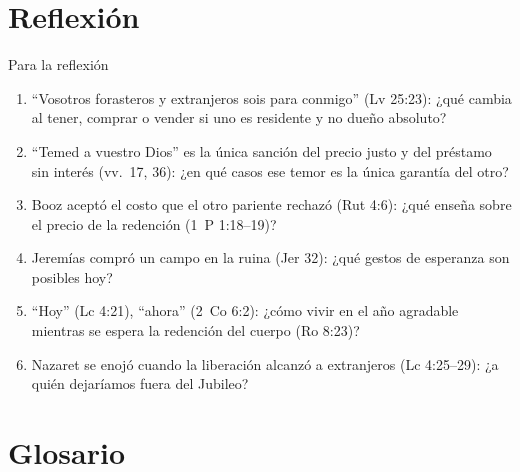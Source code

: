\section{Reflexión}

\begin{frame}{Para la reflexión}
\small
\begin{enumerate}
\item ``Vosotros forasteros y extranjeros sois para conmigo'' (Lv 25:23): ¿qué cambia al tener, comprar o vender si uno es residente y no dueño absoluto?
\item ``Temed a vuestro Dios'' es la única sanción del precio justo y del préstamo sin interés (vv.~17, 36): ¿en qué casos ese temor es la única garantía del otro?
\item Booz aceptó el costo que el otro pariente rechazó (Rut 4:6): ¿qué enseña sobre el precio de la redención (1~P 1:18--19)?
\item Jeremías compró un campo en la ruina (Jer 32): ¿qué gestos de esperanza son posibles hoy?
\item ``Hoy'' (Lc 4:21), ``ahora'' (2~Co 6:2): ¿cómo vivir en el año agradable mientras se espera la redención del cuerpo (Ro 8:23)?
\item Nazaret se enojó cuando la liberación alcanzó a extranjeros (Lc 4:25--29): ¿a quién dejaríamos fuera del Jubileo?
\end{enumerate}
\end{frame}

\section{Glosario}

